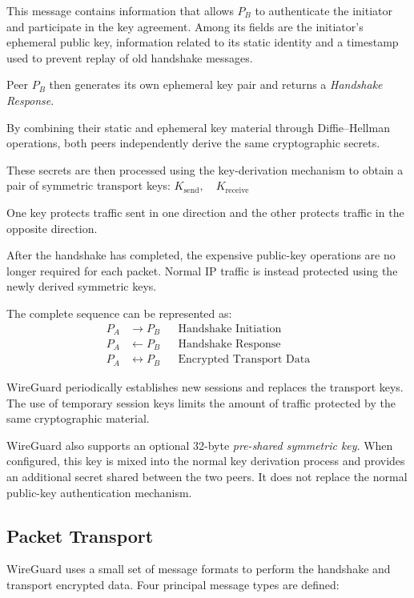 This message contains information that allows \(P_B\) to authenticate the initiator and participate in the key agreement. Among its fields are the initiator's ephemeral public key, information related to its static identity and a timestamp used to prevent replay of old handshake messages.

Peer \(P_B\) then generates its own ephemeral key pair and returns a \textit{Handshake Response}.

By combining their static and ephemeral key material through Diffie--Hellman operations, both peers independently derive the same cryptographic secrets.

These secrets are then processed using the key-derivation mechanism to obtain a pair of symmetric transport keys: \( K_{\text{send}}, \quad K_{\text{receive}}\)

One key protects traffic sent in one direction and the other protects traffic in the opposite direction.

After the handshake has completed, the expensive public-key operations are no longer required for each packet. Normal IP traffic is instead protected using the newly derived symmetric keys.

The complete sequence can be represented as:
\[
	\begin{aligned}
		P_A & \longrightarrow P_B
		    &                         & \text{Handshake Initiation}     \\
		P_A & \longleftarrow P_B
		    &                         & \text{Handshake Response}       \\
		P_A & \longleftrightarrow P_B
		    &                         & \text{Encrypted Transport Data}
	\end{aligned}
\]

WireGuard periodically establishes new sessions and replaces the transport keys. The use of temporary session keys limits the amount of traffic protected by the same cryptographic material.

WireGuard also supports an optional 32-byte \textit{pre-shared symmetric key}. When configured, this key is mixed into the normal key derivation process and provides an additional secret shared between the two peers. It does not replace the normal public-key authentication mechanism.

\subsection{Packet Transport}
WireGuard uses a small set of message formats to perform the handshake and transport encrypted data. Four principal message types are defined:

